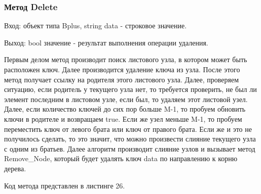 \documentclass[11pt,a4paper,final]{article} %
\begin{document}
\subsubsection{Метод Delete}
Вход: объект типа Bplus, string data - строковое значение. \par
Выход: bool значение - результат выполнения операции удаления. \par
Первым делом метод производит поиск листового узла, в котором может быть расположен ключ. Далее производится удаление ключа из узла. После этого метод получает ссылку на родителя этого листового узла. Далее, проверяем ситуацию, если родитель у текущего узла нет, то требуется проверить, не был ли элемент последним в листовом узле, если был, то удаляем этот листовой узел. Далее, если количество ключей до сих пор больше M-1, то пробуем обновить ключи в родителе и возвращаем true. Если же узел меньше M-1, то пробуем переместить ключ от левого брата или ключ от правого брата. Если же и это не получилось сделать, то это значит, что можно произвести слияние текущего узла с одним из братьев. Далее алгоритм производит слияние узлов и вызывает метод Remove\_Node, который будет удалять ключ data по направлению к корню дерева. \par
Код метода представлен в листинге 26.
\end{document}
